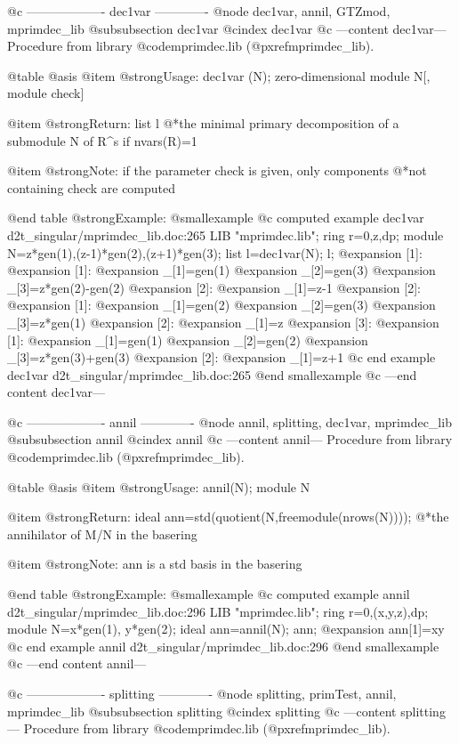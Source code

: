 @c ------------------- dec1var -------------
@node dec1var, annil, GTZmod, mprimdec_lib
@subsubsection dec1var
@cindex dec1var
@c ---content dec1var---
Procedure from library @code{mprimdec.lib} (@pxref{mprimdec_lib}).

@table @asis
@item @strong{Usage:}
dec1var (N); zero-dimensional module N[, module check]

@item @strong{Return:}
list l
@*the minimal primary decomposition of a submodule N of R^s
if nvars(R)=1

@item @strong{Note:}
if the parameter check is given, only components
@*not containing check are computed

@end table
@strong{Example:}
@smallexample
@c computed example dec1var d2t_singular/mprimdec_lib.doc:265 
LIB "mprimdec.lib";
ring r=0,z,dp;
module N=z*gen(1),(z-1)*gen(2),(z+1)*gen(3);
list l=dec1var(N);
l;
@expansion{} [1]:
@expansion{}    [1]:
@expansion{}       _[1]=gen(1)
@expansion{}       _[2]=gen(3)
@expansion{}       _[3]=z*gen(2)-gen(2)
@expansion{}    [2]:
@expansion{}       _[1]=z-1
@expansion{} [2]:
@expansion{}    [1]:
@expansion{}       _[1]=gen(2)
@expansion{}       _[2]=gen(3)
@expansion{}       _[3]=z*gen(1)
@expansion{}    [2]:
@expansion{}       _[1]=z
@expansion{} [3]:
@expansion{}    [1]:
@expansion{}       _[1]=gen(1)
@expansion{}       _[2]=gen(2)
@expansion{}       _[3]=z*gen(3)+gen(3)
@expansion{}    [2]:
@expansion{}       _[1]=z+1
@c end example dec1var d2t_singular/mprimdec_lib.doc:265
@end smallexample
@c ---end content dec1var---

@c ------------------- annil -------------
@node annil, splitting, dec1var, mprimdec_lib
@subsubsection annil
@cindex annil
@c ---content annil---
Procedure from library @code{mprimdec.lib} (@pxref{mprimdec_lib}).

@table @asis
@item @strong{Usage:}
annil(N); module N

@item @strong{Return:}
ideal ann=std(quotient(N,freemodule(nrows(N))));
@*the annihilator of M/N in the basering

@item @strong{Note:}
ann is a std basis in the basering

@end table
@strong{Example:}
@smallexample
@c computed example annil d2t_singular/mprimdec_lib.doc:296 
LIB "mprimdec.lib";
ring r=0,(x,y,z),dp;
module N=x*gen(1), y*gen(2);
ideal ann=annil(N);
ann;
@expansion{} ann[1]=xy
@c end example annil d2t_singular/mprimdec_lib.doc:296
@end smallexample
@c ---end content annil---

@c ------------------- splitting -------------
@node splitting, primTest, annil, mprimdec_lib
@subsubsection splitting
@cindex splitting
@c ---content splitting---
Procedure from library @code{mprimdec.lib} (@pxref{mprimdec_lib}).

